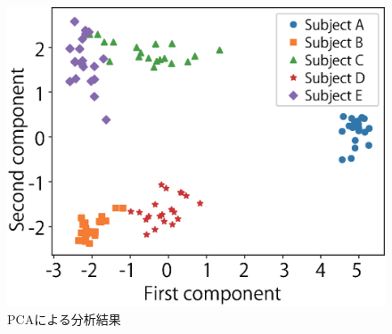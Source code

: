 \documentclass[a4j]{jarticle}%
\begin{document}
\begin{figure}[!t]
  \begin{center}
    \includegraphics[width=1\linewidth]{PCA.eps}
  \end{center}
    \vspace{-8mm}
  \caption{PCAによる分析結果}
  \label{pca}
\end{figure}




\end{document}
